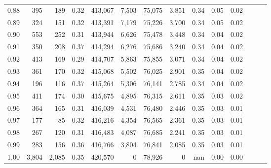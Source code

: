 \begin{tabular}{rrrrrrrrrrrrrr}
0.88 &     395 &    189 &  0.32 &  413,067 &    7,503 &  75,075 &   3,851 &  0.34 &  0.05 &      0.02 \\
0.89 &     324 &    151 &  0.32 &  413,391 &    7,179 &  75,226 &   3,700 &  0.34 &  0.05 &      0.02 \\
0.90 &     553 &    252 &  0.31 &  413,944 &    6,626 &  75,478 &   3,448 &  0.34 &  0.04 &      0.02 \\
0.91 &     350 &    208 &  0.37 &  414,294 &    6,276 &  75,686 &   3,240 &  0.34 &  0.04 &      0.02 \\
0.92 &     413 &    169 &  0.29 &  414,707 &    5,863 &  75,855 &   3,071 &  0.34 &  0.04 &      0.02 \\
0.93 &     361 &    170 &  0.32 &  415,068 &    5,502 &  76,025 &   2,901 &  0.35 &  0.04 &      0.02 \\
0.94 &     196 &    116 &  0.37 &  415,264 &    5,306 &  76,141 &   2,785 &  0.34 &  0.04 &      0.02 \\
0.95 &     411 &    174 &  0.30 &  415,675 &    4,895 &  76,315 &   2,611 &  0.35 &  0.03 &      0.02 \\
0.96 &     364 &    165 &  0.31 &  416,039 &    4,531 &  76,480 &   2,446 &  0.35 &  0.03 &      0.01 \\
0.97 &     177 &     85 &  0.32 &  416,216 &    4,354 &  76,565 &   2,361 &  0.35 &  0.03 &      0.01 \\
0.98 &     267 &    120 &  0.31 &  416,483 &    4,087 &  76,685 &   2,241 &  0.35 &  0.03 &      0.01 \\
0.99 &     283 &    156 &  0.36 &  416,766 &    3,804 &  76,841 &   2,085 &  0.35 &  0.03 &      0.01 \\
1.00 &   3,804 &  2,085 &  0.35 &  420,570 &        0 &  78,926 &       0 &   nan &  0.00 &      0.00 \\
\bottomrule
\end{tabular}
